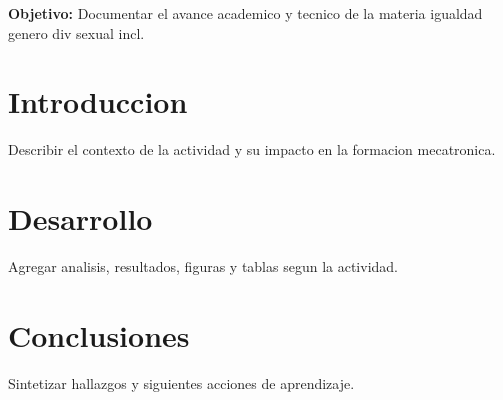 \documentclass[spanish,letterpaper,oneside]{article}
\begin{document}
\templatePortrait
\templatePagecfg
\onehalfspacing

\begin{abstractd}
\textbf{Objetivo:} Documentar el avance academico y tecnico de la materia igualdad genero div sexual incl.
\end{abstractd}

\templateIndex
\templateFinalcfg

\section{Introduccion}
Describir el contexto de la actividad y su impacto en la formacion mecatronica.

\section{Desarrollo}
Agregar analisis, resultados, figuras y tablas segun la actividad.

\section{Conclusiones}
Sintetizar hallazgos y siguientes acciones de aprendizaje.



\end{document}
